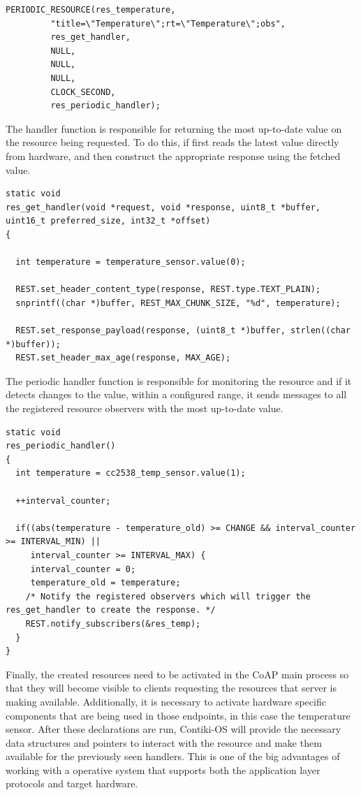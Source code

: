 \begin{lstlisting}[caption={CoAP Periodic Resource Declaration}]
PERIODIC_RESOURCE(res_temperature,
         "title=\"Temperature\";rt=\"Temperature\";obs",
         res_get_handler,
         NULL,
         NULL,
         NULL,
         CLOCK_SECOND,
         res_periodic_handler);
\end{lstlisting}

The handler function is responsible for returning the most up-to-date value on the resource being requested. To do this, if first reads the latest value directly from hardware, and then construct the appropriate response using the fetched value.

\begin{lstlisting}[caption={CoAP Periodic Resource Handler}]
static void
res_get_handler(void *request, void *response, uint8_t *buffer, uint16_t preferred_size, int32_t *offset)
{

  int temperature = temperature_sensor.value(0);

  REST.set_header_content_type(response, REST.type.TEXT_PLAIN);
  snprintf((char *)buffer, REST_MAX_CHUNK_SIZE, "%d", temperature);

  REST.set_response_payload(response, (uint8_t *)buffer, strlen((char *)buffer));
  REST.set_header_max_age(response, MAX_AGE);
\end{lstlisting}

The periodic handler function is responsible for monitoring the resource and if it detects changes to the value, within a configured range, it sends messages to all the registered resource observers with the most up-to-date value.

\begin{lstlisting}[caption={CoAP Periodic Resource Periodic Handler}]
static void
res_periodic_handler()
{
  int temperature = cc2538_temp_sensor.value(1);

  ++interval_counter;

  if((abs(temperature - temperature_old) >= CHANGE && interval_counter >= INTERVAL_MIN) || 
     interval_counter >= INTERVAL_MAX) {
     interval_counter = 0;
     temperature_old = temperature;
    /* Notify the registered observers which will trigger the res_get_handler to create the response. */
    REST.notify_subscribers(&res_temp);
  }
}
\end{lstlisting}

Finally, the created resources need to be activated in the \gls{CoAP} main process so that they will become visible to clients requesting the resources that server is making available. Additionally, it is necessary to activate hardware specific components that are being used in those endpoints, in this case the temperature sensor. After these declarations are run, Contiki-OS will provide the necessary data structures and pointers to interact with the resource and make them available for the previously seen handlers. This is one of the big advantages of working with a operative system that supports both the application layer protocols and target hardware.

